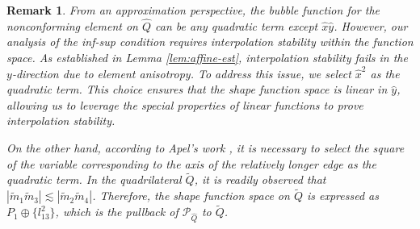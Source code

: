 \documentclass[a4paper,11pt,fleqn]{article}
\newtheorem{remark}[theorem]{Remark}
\numberwithin{equation}{section}
\begin{document}
\begin{remark}\label{rmk:bubble-choice}
	From an approximation perspective, the bubble function for the nonconforming element on $\hat{Q}$ can be any quadratic term except $\hat{x}\hat{y}$. However, our analysis of the inf-sup condition requires interpolation stability within the function space. As established in Lemma \ref{lem:affine-est}, interpolation stability fails in the $y$-direction due to element anisotropy.	To address this issue, we select $\hat{x}^2$ as the quadratic term. This choice ensures that the shape function space is linear in $\hat{y}$, allowing us to leverage the special properties of linear functions to prove interpolation stability. 
	
	On the other hand, according to Apel's work \cite{Apel2001cr}, it is necessary to select the square of the variable corresponding to the axis of the relatively longer edge as the quadratic term. In the quadrilateral $\tilde{Q}$, it is readily observed that $|\tilde{m}_1\tilde{m}_3| \lesssim |\tilde{m}_2\tilde{m}_4|$. Therefore, the shape function space on $\tilde{Q}$ is expressed as $P_1 \oplus \{l_{13}^2\}$, which is the pullback of $\mathcal{P}_{\hat{Q}}$ to $\tilde{Q}$.
\end{remark}
\end{document}
